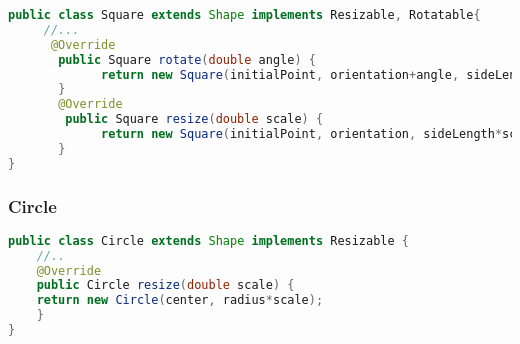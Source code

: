 \documentclass{article}
\begin{document}
\begin{lstlisting}[language=Java,escapechar=|]
public class Square extends Shape implements Resizable, Rotatable{
     //...
      @Override
       public Square rotate(double angle) {
             return new Square(initialPoint, orientation+angle, sideLength);
       }
       @Override
        public Square resize(double scale) {
             return new Square(initialPoint, orientation, sideLength*scale);
       }
}
\end{lstlisting}

\subsubsection{Circle}



\begin{lstlisting}[language=Java,escapechar=|]
public class Circle extends Shape implements Resizable { 
    //..
    @Override
    public Circle resize(double scale) {
    return new Circle(center, radius*scale);
    }
}
\end{lstlisting}
\end{document}
